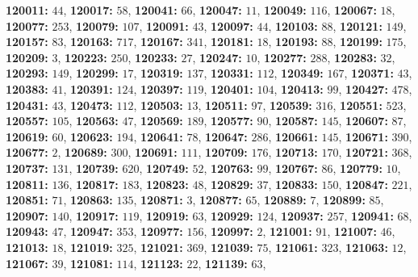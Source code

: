 \textsf{\bfseries 120011:} $44$, \textsf{\bfseries 120017:} $58$, \textsf{\bfseries 120041:} $66$, \textsf{\bfseries 120047:} $11$, \textsf{\bfseries 120049:} $116$, \textsf{\bfseries 120067:} $18$, \textsf{\bfseries 120077:} $253$, \textsf{\bfseries 120079:} $107$, \textsf{\bfseries 120091:} $43$, \textsf{\bfseries 120097:} $44$, \textsf{\bfseries 120103:} $88$, \textsf{\bfseries 120121:} $149$, \textsf{\bfseries 120157:} $83$, \textsf{\bfseries 120163:} $717$, \textsf{\bfseries 120167:} $341$, \textsf{\bfseries 120181:} $18$, \textsf{\bfseries 120193:} $88$, \textsf{\bfseries 120199:} $175$, \textsf{\bfseries 120209:} $3$, \textsf{\bfseries 120223:} $250$, \textsf{\bfseries 120233:} $27$, \textsf{\bfseries 120247:} $10$, \textsf{\bfseries 120277:} $288$, \textsf{\bfseries 120283:} $32$, \textsf{\bfseries 120293:} $149$, \textsf{\bfseries 120299:} $17$, \textsf{\bfseries 120319:} $137$, \textsf{\bfseries 120331:} $112$, \textsf{\bfseries 120349:} $167$, \textsf{\bfseries 120371:} $43$, \textsf{\bfseries 120383:} $41$, \textsf{\bfseries 120391:} $124$, \textsf{\bfseries 120397:} $119$, \textsf{\bfseries 120401:} $104$, \textsf{\bfseries 120413:} $99$, \textsf{\bfseries 120427:} $478$, \textsf{\bfseries 120431:} $43$, \textsf{\bfseries 120473:} $112$, \textsf{\bfseries 120503:} $13$, \textsf{\bfseries 120511:} $97$, \textsf{\bfseries 120539:} $316$, \textsf{\bfseries 120551:} $523$, \textsf{\bfseries 120557:} $105$, \textsf{\bfseries 120563:} $47$, \textsf{\bfseries 120569:} $189$, \textsf{\bfseries 120577:} $90$, \textsf{\bfseries 120587:} $145$, \textsf{\bfseries 120607:} $87$, \textsf{\bfseries 120619:} $60$, \textsf{\bfseries 120623:} $194$, \textsf{\bfseries 120641:} $78$, \textsf{\bfseries 120647:} $286$, \textsf{\bfseries 120661:} $145$, \textsf{\bfseries 120671:} $390$, \textsf{\bfseries 120677:} $2$, \textsf{\bfseries 120689:} $300$, \textsf{\bfseries 120691:} $111$, \textsf{\bfseries 120709:} $176$, \textsf{\bfseries 120713:} $170$, \textsf{\bfseries 120721:} $368$, \textsf{\bfseries 120737:} $131$, \textsf{\bfseries 120739:} $620$, \textsf{\bfseries 120749:} $52$, \textsf{\bfseries 120763:} $99$, \textsf{\bfseries 120767:} $86$, \textsf{\bfseries 120779:} $10$, \textsf{\bfseries 120811:} $136$, \textsf{\bfseries 120817:} $183$, \textsf{\bfseries 120823:} $48$, \textsf{\bfseries 120829:} $37$, \textsf{\bfseries 120833:} $150$, \textsf{\bfseries 120847:} $221$, \textsf{\bfseries 120851:} $71$, \textsf{\bfseries 120863:} $135$, \textsf{\bfseries 120871:} $3$, \textsf{\bfseries 120877:} $65$, \textsf{\bfseries 120889:} $7$, \textsf{\bfseries 120899:} $85$, \textsf{\bfseries 120907:} $140$, \textsf{\bfseries 120917:} $119$, \textsf{\bfseries 120919:} $63$, \textsf{\bfseries 120929:} $124$, \textsf{\bfseries 120937:} $257$, \textsf{\bfseries 120941:} $68$, \textsf{\bfseries 120943:} $47$, \textsf{\bfseries 120947:} $353$, \textsf{\bfseries 120977:} $156$, \textsf{\bfseries 120997:} $2$, \textsf{\bfseries 121001:} $91$, \textsf{\bfseries 121007:} $46$, \textsf{\bfseries 121013:} $18$, \textsf{\bfseries 121019:} $325$, \textsf{\bfseries 121021:} $369$, \textsf{\bfseries 121039:} $75$, \textsf{\bfseries 121061:} $323$, \textsf{\bfseries 121063:} $12$, \textsf{\bfseries 121067:} $39$, \textsf{\bfseries 121081:} $114$, \textsf{\bfseries 121123:} $22$, \textsf{\bfseries 121139:} $63$, 
